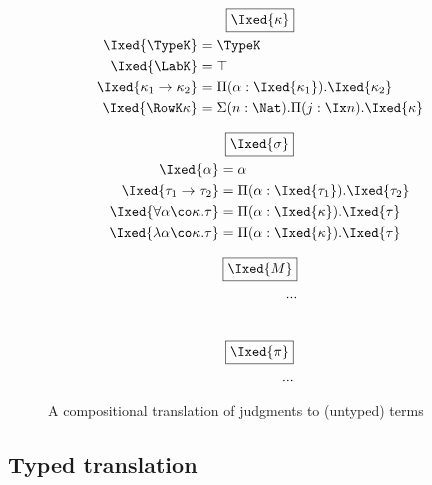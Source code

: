 \documentclass[authoryear,acmsmall,screen]{acmart}
\begin{document}
\begin{figure}[H]
\begin{gather*}
\fbox{$\Ixed{\kappa}$} \\
\begin{align*}
\vspace{5em}
\Ixed{\TypeK} &= \TypeK \\
\Ixed{\LabK} &= \top \\
\Ixed{\kappa_1 \to \kappa_2} &= \Pi (\alpha : \Ixed{\kappa_1}). \Ixed{\kappa_2} \\
\Ixed{\RowK \kappa} &= \Sigma(n : \Nat). \Pi (j : \Ix  n). \Ixed{\kappa} \\
\end{align*}
\end{gather*}

\begin{gather*}
\fbox{$\Ixed{\sigma}$} \\
\begin{align*}
\vspace{5em}
\Ixed{\alpha} &= \alpha \\
\Ixed{\tau_1 \to \tau_2} &= \Pi (\alpha : \Ixed{\tau_1}).\Ixed{\tau_2} \\
\Ixed{\forall \alpha \co \kappa. \tau} &= \Pi (\alpha : \Ixed{\kappa}).\Ixed{\tau} \\
\Ixed{\lambda \alpha \co \kappa. \tau} &= \Pi (\alpha : \Ixed{\kappa}).\Ixed{\tau} \\
\end{align*}
\end{gather*}

\begin{align*}
\fbox{$\Ixed{M}$} \\
\vspace{5em}
...
\end{align*} \\
\begin{align*}
\fbox{$\Ixed{\pi}$} \\
\vspace{5em}
...
\end{align*}
\caption{A compositional translation of \RO judgments to (untyped) \IX{} terms}
\label{fig:translation}
\end{figure}


\subsection{Typed translation}
\end{document}
